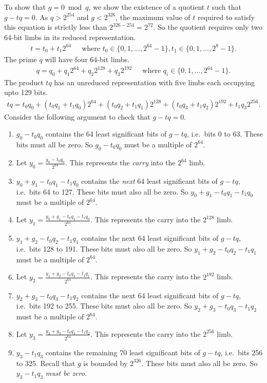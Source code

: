 \documentclass[a4paper, 12pt]{article}
\begin{document}
To show that $g = 0 \bmod q$, we show the existence of a quotient $t$ such that $g-tq = 0$. As $q > 2^{254}$ and $g < 2^{326}$, the maximum value of $t$ required to satisfy this equation is strictly less than $2^{326-254} = 2^{72}$. So the quotient requires only two 64-bit limbs in its reduced representation.
\begin{align*}
  t = t_0 + t_1 2^{64}\ \ \ \ \ \text{ where } t_0 \in \{0,1,\ldots,2^{64}-1\}, t_1 \in \{0,1,\ldots,2^8-1\}.
\end{align*}
The prime $q$ will have four 64-bit limbs.
\begin{align*}
  q = q_0 + q_1 2^{64} + q_2 2^{128} + q_3 2^{192} \ \ \ \ \ \text{ where } q_i \in \{0,1,\ldots,2^{64}-1\}.
\end{align*}
The product $tq$ has an unreduced representation with five limbs each occupying upto 129 bits.
\begin{align*}
  tq  = t_0q_0 + (t_0q_1 + t_1q_0) 2^{64} + (t_0q_2 + t_1q_1) 2^{128} + (t_0q_3 + t_1q_2) 2^{192} + t_1q_3 2^{256}.
\end{align*}
Consider the following argument to check that $g-tq = 0$.
\begin{enumerate}
  \item $g_0-t_0q_0$ contains the 64 least significant bits of $g-tq$, i.e.~bits 0 to 63. These bits must all be zero. So $g_0-t_0q_0$ must be a multiple of $2^{64}$. 
  \item Let $y_0 = \frac{g_0-t_0q_0}{2^{64}}$. This represents the \textit{carry} into the $2^{64}$ limb.
  \item $y_0+g_1-t_0q_1-t_1q_0$ contains the \textit{next} 64 least significant bits of $g-tq$, i.e.~bits 64 to 127. These bits must also all be zero. So $y_0+g_1-t_0q_1-t_1q_0$ must be a multiple of $2^{64}$.
  \item Let $y_1 = \frac{y_0+g_1-t_0q_1-t_1q_0}{2^{64}}$. This represents the carry into the $2^{128}$ limb.
  \item $y_1+g_2-t_0q_2-t_1q_1$ contains the next 64 least significant bits of $g-tq$, i.e.~bits 128 to 191. These bits must also all be zero. So $y_1+g_2-t_0q_2-t_1q_1$ must be a multiple of $2^{64}$.
  \item Let $y_2 = \frac{y_1+g_2-t_0q_2-t_1q_1}{2^{64}}$. This represents the carry into the $2^{192}$ limb.
  \item $y_2+g_3-t_0q_3-t_1q_2$ contains the next 64 least significant bits of $g-tq$, i.e.~bits 192 to 255. These bits must also all be zero. So $y_2+g_3-t_0q_3-t_1q_2$ must be a multiple of $2^{64}$.
  \item Let $y_3 = \frac{y_2+g_3-t_0q_3-t_1q_2}{2^{64}}$. This represents the carry into the $2^{256}$ limb.
  \item $y_3-t_1q_3$ contains the remaining 70 least significant bits of $g-tq$, i.e.~bits 256 to 325. Recall that $g$ is bounded by $2^{326}$. These bits must also all be zero. So $y_3-t_1q_3$ \textit{must be zero}.
\end{enumerate}
\end{document}
